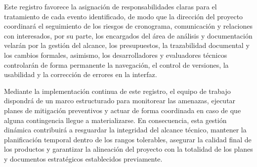\documentclass[11pt,spanish]{article}
\begin{document}
Este registro favorece la asignación de responsabilidades claras para el tratamiento de cada evento identificado, de modo que la dirección del proyecto coordinará el seguimiento de los riesgos de cronograma, comunicación y relaciones con interesados, por su parte, los encargados del área de análisis y documentación velarán por la gestión del alcance, los presupuestos, la trazabilidad documental y los cambios formales, asimismo, los desarrolladores y evaluadores técnicos controlarán de forma permanente la navegación, el control de versiones, la usabilidad y la corrección de errores en la interfaz.

Mediante la implementación continua de este registro, el equipo de trabajo dispondrá de un marco estructurado para monitorear las amenazas, ejecutar planes de mitigación preventivos y actuar de forma coordinada en caso de que alguna contingencia llegue a materializarse. En consecuencia, esta gestión dinámica contribuirá a resguardar la integridad del alcance técnico, mantener la planificación temporal dentro de los rangos tolerables, asegurar la calidad final de los productos y garantizar la alineación del proyecto con la totalidad de los planes y documentos estratégicos establecidos previamente.
\end{document}

